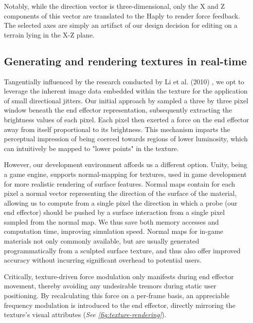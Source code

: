Notably, while the direction vector is three-dimensional, only the X and Z components of this vector are translated to the Haply to render force feedback. The selected axes are simply an artifact of our design decision for editing on a terrain lying in the X-Z plane.

\subsection{Generating and rendering textures in real-time} \label{subsec:texture-rendering}

Tangentially influenced by the research conducted by Li et al. (2010) \cite{li2010image}, we opt to leverage the inherent image data embedded within the texture for the application of small directional jitters. Our initial approach by sampled a three by three pixel window beneath the end effector representation, subsequently extracting the brightness values of each pixel. Each pixel then exerted a force on the end effector away from itself proportional to its brightness. This mechanism imparts the perceptual impression of being coerced towards regions of lower luminosity, which can intuitively be mapped to "lower points" in the texture.

However, our development environment affords us a different option. Unity, being a game engine, supports normal-mapping for textures, used in game development for more realistic rendering of surface features. Normal maps contain for each pixel a normal vector representing the direction of the surface of the material, allowing us to compute from a single pixel the direction in which a probe (our end effector) should be pushed by a surface interaction from a single pixel sampled from the normal map. We thus save both memory accesses and computation time, improving simulation speed. Normal maps for in-game materials not only commonly available, but are usually generated programmatically from a sculpted surface texture, and thus also offer improved accuracy without incurring significant overhead to potential users.

Critically, texture-driven force modulation only manifests during end effector movement, thereby avoiding any undesirable tremors during static user positioning. By recalculating this force on a per-frame basis, an appreciable frequency modulation is introduced to the end effector, directly mirroring the texture's visual attributes (\textit{See \ref{fig:texture-rendering}}).

